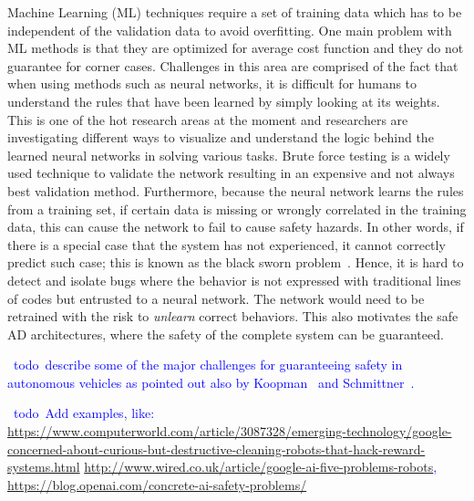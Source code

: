 \documentclass[sigconf,review, anonymous]{acmart}
\newcommand{\todo}[1]{\textcolor{blue}{\ding{46}~{\sf todo}~#1}}
\begin{document}

Machine Learning (ML) techniques require a set of training data which has to be independent of the validation data to avoid overfitting. One main problem with ML methods is that they are optimized for average cost function and they do not guarantee for corner cases. Challenges in this area are comprised of the fact that when using methods such as neural networks, it is difficult for humans to understand the rules that have been learned by simply looking at its weights. This is one of the hot research areas at the moment and researchers are investigating different ways to visualize and understand the logic behind the learned neural networks in solving various tasks. Brute force testing is a widely used technique to validate the network resulting in an expensive and not always best validation method. Furthermore, because the neural network learns the rules from a training set, if certain data is missing or wrongly correlated in the training data, this can cause the network to fail to cause safety hazards. In other words, if there is a special case that the system has not experienced, it cannot correctly predict such case; this is known as the black sworn problem~\cite{Nassim:2007vq}. Hence, it is hard to detect and isolate bugs where the behavior is not expressed with traditional lines of codes but entrusted to a neural network. The network would need to be retrained with the risk to \emph{unlearn} correct behaviors. This also motivates the safe AD architectures, where the safety of the complete system can be guaranteed.


\todo{describe some of the major challenges for guaranteeing safety in autonomous vehicles as pointed out also by Koopman~\cite{Koopman:2016hh} and Schmittner~\cite{Schmittner:2014dn}.}

\todo{Add examples, like: \url{https://www.computerworld.com/article/3087328/emerging-technology/google-concerned-about-curious-but-destructive-cleaning-robots-that-hack-reward-systems.html}
\url{http://www.wired.co.uk/article/google-ai-five-problems-robots},
\url{https://blog.openai.com/concrete-ai-safety-problems/}}

\end{document}
